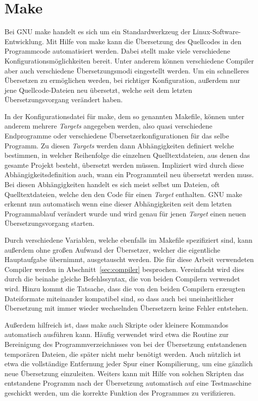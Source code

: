 \section{Make}
\label{sec:make}
Bei GNU make handelt es sich um ein Standardwerkzeug der Linux-Software-Entwicklung. Mit Hilfe von make kann die Übersetzung des Quellcodes in den Programmcode automatisiert werden. 
Dabei stellt make viele verschiedene Konfigurationsmöglichkeiten bereit. Unter anderem können verschiedene Compiler aber auch verschiedene Übersetzungsmodi eingestellt werden.
Um ein schnelleres Übersetzen zu ermöglichen werden, bei richtiger Konfiguration, außerdem nur jene Quellcode-Dateien neu übersetzt, welche seit dem letzten Übersetzungsvorgang verändert haben. 

In der Konfigurationsdatei für make, dem so genannten Makefile, können unter anderem mehrere \textit{Targets} angegeben werden, also quasi verschiedene Endprogramme oder verschiedene
Übersetzerkonfigurationen für das selbe Programm. Zu diesen \textit{Targets} werden dann Ab\-hängig\-keiten definiert welche bestimmen, in welcher Reihenfolge die einzelnen Quelltextdateien, aus denen das gesamte Projekt besteht, übersetzt werden 
müssen. Impliziert wird durch diese Abhängigkeitsdefinition auch, wann ein Programmteil neu übersetzt werden muss. Bei diesen Abhängigkeiten handelt es sich meist selbst um Dateien, oft Quelltextdateien, welche den
den Code für einen \textit{Target} enthalten. GNU make erkennt nun automatisch wenn eine dieser Abhängigkeiten seit dem letzten Programmablauf verändert wurde und wird genau für jenen \textit{Target} einen neuen
Übersetzungsvorgang starten.

Durch verschiedene Variablen, welche ebenfalls im Makefile spezifiziert sind, kann außerdem ohne großen Aufwand der Übersetzer, welcher die eigentliche Hauptaufgabe übernimmt, ausgetauscht werden.
Die für diese Arbeit verwendeten Compiler werden in Abschnitt~\ref{sec:compiler} besprochen. Vereinfacht wird dies durch die beinahe gleiche Befehlssyntax, die von beiden Compilern verwendet wird.
Hinzu kommt die Tatsache, dass die von den beiden Compilern erzeugten Dateiformate miteinander kompatibel sind, so dass auch bei uneinheitlicher Übersetzung mit immer wieder wechselnden Übersetzern
keine Fehler entstehen.

Außerdem hilfreich ist, dass make auch Skripte oder kleinere Kommandos automatisch aus\-füh\-ren kann. Häufig verwendet wird etwa die Routine zur Bereinigung des Programmverzeichnisses von bei der
Übersetzung entstandenen temporären Dateien, die später nicht mehr benötigt werden. Auch nützlich ist etwa die vollständige Entfernung jeder Spur einer Kompilierung, um eine gänzlich neue
Übersetzung einzuleiten. Weiters kann mit Hilfe von solchen Skripten das entstandene Programm nach der Übersetzung automatisch auf eine Testmaschine geschickt werden, um die korrekte Funktion
des Programmes zu verifizieren.

